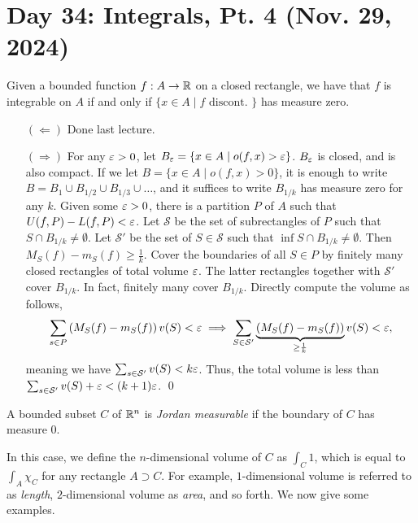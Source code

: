 \section{Day 34: Integrals, Pt. 4 (Nov. 29, 2024)}
\begin{simplethm}
    Given a bounded function $f : A \to \mathbb R$ on a closed rectangle, we have that $f$ is integrable on $A$ if and only if $\{x \in A \mid f \text{ discont. }\}$ has measure zero.
\end{simplethm}
\begin{itemize}
    \item[$(\Leftarrow)$] Done last lecture.
    \item[$(\Rightarrow)$] For any $\varepsilon > 0$, let $B_\varepsilon = \{x \in A \mid o(f, x) > \varepsilon\}$. $B_\varepsilon$ is closed, and is also compact. If we let $B = \{x \in A \mid o(f, x) > 0\}$, it is enough to write $B = B_1 \cup B_{1/2} \cup B_{1/3} \cup \dots$, and it suffices to write $B_{1/k}$ has measure zero for any $k$.
    \medskip\newline
    Given some $\varepsilon > 0$, there is a partition $P$ of $A$ such that $U(f, P) - L(f, P) < \varepsilon$. Let $\mathcal{S}$ be the set of subrectangles of $P$ such that $S \cap B_{1/k} \neq \emptyset$. Let $\mathcal{S}'$ be the set of $S \in \mathcal{S}$ such that $\inf S \cap B_{1/k} \neq \emptyset$. Then $M_S(f) - m_S(f) \geq \frac{1}{k}$. Cover the boundaries of all $S \in P$ by finitely many closed rectangles of total volume $\varepsilon$. The latter rectangles together with $\mathcal{S}'$ cover $B_{1/k}$. In fact, finitely many cover $B_{1/k}$. Directly compute the volume as follows,
    \[ \sum_{s \in P} \left(M_S(f) - m_S(f)\right) v(S) < \varepsilon \implies \sum_{S \in \mathcal{S}'} \underbrace{\left(M_S(f) - m_S(f)\right)}_{\geq \frac{1}{k}} v(S) < \varepsilon, \]
    meaning we have $\sum_{s \in \mathcal{S}'} v(S) < k \varepsilon$. Thus, the total volume is less than $\sum_{s \in \mathcal{S}'} v(S) + \varepsilon < (k + 1)\varepsilon$. \qed
\end{itemize}
\begin{definition}
    A bounded subset $C$ of $\mathbb R^n$ is \textit{Jordan measurable} if the boundary of $C$ has measure $0$.
\end{definition}
\noindent In this case, we define the $n$-dimensional volume of $C$ as $\int_C 1$, which is equal to $\int_A \chi_C$ for any rectangle $A \supset C$. For example, $1$-dimensional volume is referred to as \textit{length}, $2$-dimensional volume as \textit{area}, and so forth. We now give some examples.
